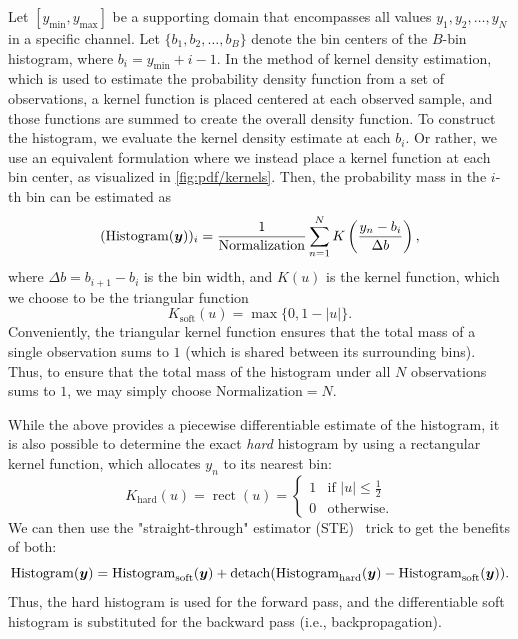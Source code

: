 Let $[y_{\mathrm{min}}, y_{\mathrm{max}}]$ be a supporting domain that encompasses all values $y_1, y_2, \ldots, y_{N}$ in a specific channel.
Let $\{b_1, b_2, \ldots, b_B\}$ denote the bin centers of the $B$-bin histogram, where $b_i = y_{\mathrm{min}} + i - 1$.
In the method of kernel density estimation, which is used to estimate the probability density function from a set of observations, a kernel function is placed centered at each observed sample, and those functions are summed to create the overall density function.
To construct the histogram, we evaluate the kernel density estimate at each $b_i$.
Or rather, we use an equivalent formulation where we instead place a kernel function at each bin center, as visualized in \cref{fig:pdf/kernels}.
Then, the probability mass in the $i$-th bin can be estimated as
\begin{equation*}
  (\operatorname{Histogram}({\boldsymbol{y}}))_i =
  \frac{1}{\mathrm{Normalization}}
  \sum_{n=1}^{N} K\left(\frac{y_n - b_i}{\Delta b}\right),
\end{equation*}
where $\Delta b = b_{i+1} - b_i$ is the bin width, and $K(u)$ is the kernel function, which we choose to be the triangular function
\begin{equation*}
  K_{\mathrm{soft}}(u) = \max \{ 0, 1 - |u| \}.
\end{equation*}
Conveniently, the triangular kernel function ensures that the total mass of a single observation sums to $1$ (which is shared between its surrounding bins).
Thus, to ensure that the total mass of the histogram under all $N$ observations sums to $1$, we may simply choose $\mathrm{Normalization} = N$.

While the above provides a piecewise differentiable estimate of the histogram, it is also possible to determine the exact \emph{hard} histogram by using a rectangular kernel function, which allocates $y_n$ to its nearest bin:
\begin{equation*}
  K_{\mathrm{hard}}(u) = \operatorname{rect}(u) =
  \begin{cases}
    1 & \text{if } |u| \leq \frac{1}{2} \\
    0 & \text{otherwise}.
  \end{cases}
\end{equation*}
We can then use the "straight-through" estimator (STE)~\cite{bengio2013estimating} trick to get the benefits of both:
\begin{equation*}
  \operatorname{Histogram}({\boldsymbol{y}}) =
  \operatorname{Histogram}_{\mathrm{soft}}({\boldsymbol{y}}) +
  \operatorname{detach}(
    \operatorname{Histogram}_{\mathrm{hard}}({\boldsymbol{y}}) -
    \operatorname{Histogram}_{\mathrm{soft}}({\boldsymbol{y}})
  ).
\end{equation*}
Thus, the hard histogram is used for the forward pass, and the differentiable soft histogram is substituted for the backward pass (i.e., backpropagation).

